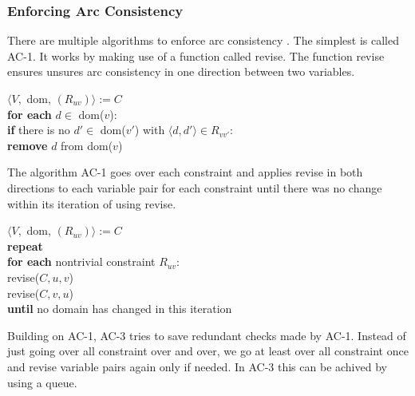 \subsubsection{Enforcing Arc Consistency}

There are multiple algorithms to enforce arc consistency \cite{arc_studied:1977} \cite{arc_again:1994}. The simplest is called AC-1. It works by making use of a function called revise. The function revise ensures unsures arc consistency in one direction between two variables.

\begin{tcolorbox}[title={\textbf{function} revise($C,v,v'$):}]
	$\langle V,$ dom, $(R_{uv})\rangle := C$ \\
	\textbf{for each} $d \in$ dom($v$): \\
	\textbf{if} there is no $d' \in$ dom($v'$) with $\langle d, d' \rangle \in R_{vv'}$: \\
	\textbf{remove} $d$ from dom($v$)
\end{tcolorbox}

The algorithm AC-1 goes over each constraint and applies revise in both directions to each variable pair for each constraint until there was no change within its iteration of using revise.

\begin{tcolorbox}[title={\textbf{function} AC-1($C$):}]
	$\langle V,$ dom, $(R_{uv})\rangle := C$ \\
	\textbf{repeat} \\
	\textbf{for each} nontrivial constraint $R_{uv}$: \\
	revise($C, u, v$) \\
	revise($C, v, u$) \\
	\textbf{until} no domain has changed in this iteration
\end{tcolorbox}

Building on AC-1, AC-3 tries to save redundant checks made by AC-1. Instead of just going over all constraint over and over, we go at least over all constraint once and revise variable pairs again only if needed. In AC-3 this can be achived by using a queue.

